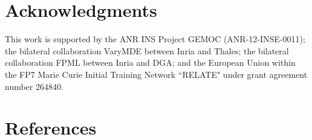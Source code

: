 \documentclass[preprint,5p]{elsarticle}
\begin{document}





%



\section*{Acknowledgments}
This work is supported by the ANR INS Project GEMOC (ANR-12-INSE-0011); the bilateral collaboration VaryMDE between Inria and Thales; the bilateral collaboration FPML between Inria and DGA; and the European Union within the FP7 Marie Curie Initial Training Network “RELATE" under grant agreement number 264840.
\section*{References}


\end{document}
